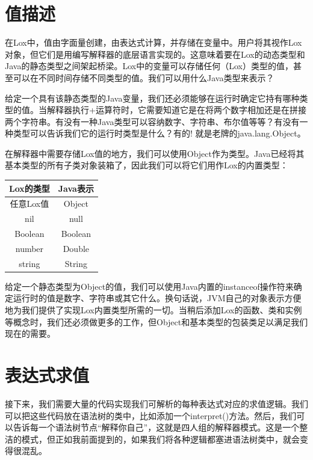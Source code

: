 \documentclass[cn,11pt,chinese]{elegantbook}
\begin{document}
\section{值描述}

在Lox中，值由字面量创建，由表达式计算，并存储在变量中。用户将其视作Lox对象，但它们是用编写解释器的底层语言实现的。这意味着要在Lox的动态类型和Java的静态类型之间架起桥梁。Lox中的变量可以存储任何（Lox）类型的值，甚至可以在不同时间存储不同类型的值。我们可以用什么Java类型来表示？

给定一个具有该静态类型的Java变量，我们还必须能够在运行时确定它持有哪种类型的值。当解释器执行+运算符时，它需要知道它是在将两个数字相加还是在拼接两个字符串。有没有一种Java类型可以容纳数字、字符串、布尔值等等？有没有一种类型可以告诉我们它的运行时类型是什么？有的! 就是老牌的java.lang.Object。

在解释器中需要存储Lox值的地方，我们可以使用Object作为类型。Java已经将其基本类型的所有子类对象装箱了，因此我们可以将它们用作Lox的内置类型：

\begin{center}
  \begin{tabular}{ |c|c| } 
   \hline
   Lox的类型 & Java表示 \\
   \hline
   任意Lox值 & Object \\ 
   nil & null \\
   Boolean & Boolean \\
   number & Double \\
   string & String \\
   \hline
  \end{tabular}
\end{center}

给定一个静态类型为Object的值，我们可以使用Java内置的instanceof操作符来确定运行时的值是数字、字符串或其它什么。换句话说，JVM自己的对象表示方便地为我们提供了实现Lox内置类型所需的一切。当稍后添加Lox的函数、类和实例等概念时，我们还必须做更多的工作，但Object和基本类型的包装类足以满足我们现在的需要。

\section{表达式求值}

接下来，我们需要大量的代码实现我们可解析的每种表达式对应的求值逻辑。我们可以把这些代码放在语法树的类中，比如添加一个interpret()方法。然后，我们可以告诉每一个语法树节点“解释你自己”，这就是四人组的解释器模式。这是一个整洁的模式，但正如我前面提到的，如果我们将各种逻辑都塞进语法树类中，就会变得很混乱。
\end{document}
